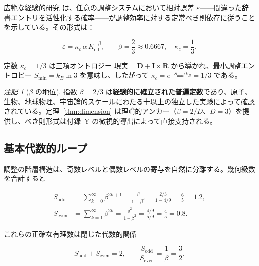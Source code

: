 \documentclass[12pt,a4paper]{article}
\theoremstyle{remark}
\newtheorem{remark}[theorem]{注記}
\begin{document}
	広範な経験的研究 \cite{AppendixL, AppendixFerra} は、任意の調整システムにおいて相対誤差 \(\varepsilon\)——間違った辞書エントリを活性化する確率——が調整効率に対する定常べき則依存に従うことを示している。その形式は：
	
	\begin{equation}
		\boxed{\varepsilon = \kappa_c \, \alpha \, K_{\mathrm{eff}}^{-\beta}, \qquad
			\beta = \frac{2}{3} \approx 0.6667,\quad \kappa_c = \frac{1}{3}}.
		\label{eq:error-law-corrected}
	\end{equation}
	
	定数 \(\kappa_c = 1/3\) は三項オントロジー \(\text{現実} = \mathbf{D} + \mathbf{I} \times \mathbf{R}\) から導かれ、最小調整エントロピー \(S_{\min} = k_B \ln 3\) を意味し、したがって \(\kappa_c = e^{-S_{\min}/k_B} = 1/3\) である。
	
	\begin{remark}[\(\beta\) の地位]
		指数 \(\beta = 2/3\) は\textbf{経験的に確立された普遍定数}であり、原子、生物、地球物理、宇宙論的スケールにわたる十以上の独立した実験によって確認されている。定理~\ref{thm:dimension} は理論的アンカー（\(\beta = 2/D\)、\(D=3\)）を提供し、べき則形式は付録~Y の微視的導出によって直接支持される。
	\end{remark}
	
	\subsection{基本代数的ループ}
	\label{sec:algebraic-loop}
	
	調整の階層構造は、奇数レベルと偶数レベルの寄与を自然に分離する。幾何級数を合計すると
	
	\begin{align}
		S_{\mathrm{odd}} &= \sum_{k=0}^{\infty} \beta^{2k+1} = \frac{\beta}{1-\beta^{2}}
		= \frac{2/3}{1 - 4/9} = \frac{6}{5} = 1.2, \label{eq:sodd}\\
		S_{\mathrm{even}} &= \sum_{k=1}^{\infty} \beta^{2k} = \frac{\beta^{2}}{1-\beta^{2}}
		= \frac{4/9}{5/9} = \frac{4}{5} = 0.8. \label{eq:seven}
	\end{align}
	
	これらの正確な有理数は閉じた代数的関係
	
	\begin{equation}
		\boxed{S_{\mathrm{odd}} + S_{\mathrm{even}} = 2, \qquad
			\frac{S_{\mathrm{odd}}}{S_{\mathrm{even}}} = \frac{1}{\beta} = \frac{3}{2}}.
		\label{eq:algebraic-loop}
	\end{equation}
	
\end{document}

